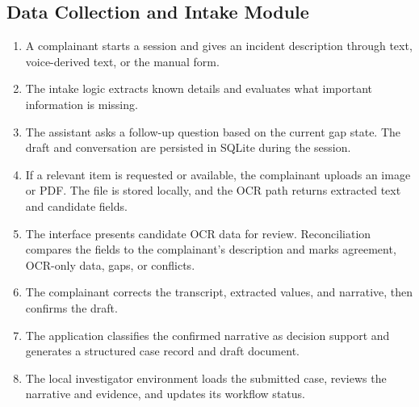 \documentclass[12pt,a4paper,oneside]{report}
\begin{document}
\subsection{Data Collection and Intake Module}
\begin{enumerate}
\item A complainant starts a session and gives an incident description through text, voice-derived text, or the manual form.
\item The intake logic extracts known details and evaluates what important information is missing.
\item The assistant asks a follow-up question based on the current gap state. The draft and conversation are persisted in SQLite during the session.
\item If a relevant item is requested or available, the complainant uploads an image or PDF. The file is stored locally, and the OCR path returns extracted text and candidate fields.
\item The interface presents candidate OCR data for review. Reconciliation compares the fields to the complainant's description and marks agreement, OCR-only data, gaps, or conflicts.
\item The complainant corrects the transcript, extracted values, and narrative, then confirms the draft.
\item The application classifies the confirmed narrative as decision support and generates a structured case record and draft document.
\item The local investigator environment loads the submitted case, reviews the narrative and evidence, and updates its workflow status.
\end{enumerate}
\end{document}
